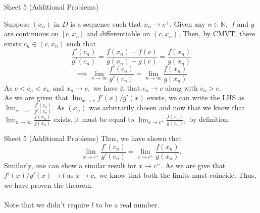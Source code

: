 \documentclass[handout, aspectratio=169]{beamer}
\begin{document}
\begin{frame}{Sheet 5 (Additional Problems)}
	
	Suppose $(x_n)$ in $D$ is a sequence such that $x_n \to c^+.$ Given any $n \in \mathbb{N},$ $f$ and $g$ are continuous on $[c, x_n]$ and differentiable on $(c, x_n).$ Then, by CMVT, there exists $c_n \in (c, x_n)$ such that
	\[\frac{f'(c_n)}{g'(c_n)} = \frac{f(x_n) - f(c)}{g(x_n) - g(c)} = \frac{f(x_n)}{g(x_n)}\]
	\[\implies \lim_{n\to \infty} \frac{f'(c_n)}{g'(c_n)} = \lim_{n\to \infty}\frac{f(x_n)}{g(x_n)}\]
	As $c < c_n < x_n$ and $x_n \to c,$ we have it that $c_n \to c$ along with $c_n > c.$\\
	As we are given that $\displaystyle\lim_{x\to c}f'(x)/g'(x)$ exists, we can write the LHS as $\displaystyle\lim_{x \to c^+} \frac{f'(c_n)}{g'(c_n)}.$ As $(x_n)$ was arbitrarily chosen and now that we know that $\displaystyle\lim_{n\to \infty}\frac{f(x_n)}{g(x_n)}$ exists, it must be equal to $\displaystyle\lim_{x \to c^+}\frac{f(x_n)}{g(x_n)},$ by definition.
\end{frame}
	
\begin{frame}{Sheet 5 (Additional Problems)}
	Thus, we have shown that
	\[\lim_{x \to c^+} \frac{f'(c_n)}{g'(c_n)} = \lim_{x \to c^+}\frac{f(x_n)}{g(x_n)}.\]
	Similarly, one can show a similar result for $x \to c^-.$ As we are give that $f'(x)/g'(x) \to l$ as $x \to c,$ we know that both the limits must coincide. Thus, we have proven the theorem.\\~\\
	Note that we didn't require $l$ to be a real number.
\end{frame}
\end{document}
